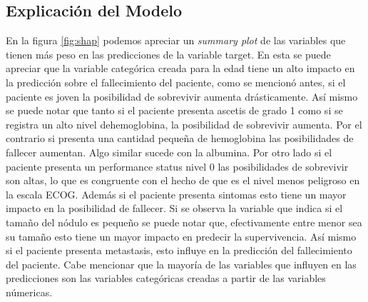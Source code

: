 \documentclass[6pt, twocolumn]{article}
\begin{document}
\subsection{Explicación del Modelo}
En la figura \ref{fig:shap} podemos apreciar un \textit{summary plot} de las variables que tienen más peso en las predicciones de la variable target. En esta se puede apreciar que la variable categ\'orica creada para la edad tiene un alto impacto en la predicción sobre el fallecimiento del paciente, como se mencionó antes, si el paciente es joven la posibilidad de sobrevivir aumenta drásticamente. Así mismo se puede notar que tanto si el paciente presenta ascetis de grado 1 como si se registra un alto nivel dehemoglobina, la posibilidad de sobrevivir aumenta. Por el contrario si presenta una cantidad pequeña de hemoglobina las posibilidades de fallecer aumentan. Algo similar sucede con la albumina. Por otro lado si el paciente presenta un performance status nivel 0 las posibilidades de sobrevivir son altas, lo que es congruente con el hecho de que es el nivel menos peligroso en la escala ECOG. Además si el paciente presenta sintomas esto tiene un mayor impacto en la posibilidad de fallecer. Si se observa la variable que indica si el tamaño del nódulo es pequeño se puede notar que, efectivamente entre menor sea su tamaño esto tiene un mayor impacto en predecir la supervivencia. Así mismo si el paciente presenta metastasis, esto influye en la predicción del fallecimiento del paciente. 
Cabe mencionar que la mayoría de las variables que influyen en las predicciones son las variables categóricas creadas a partir de las variables númericas.
\end{document}
